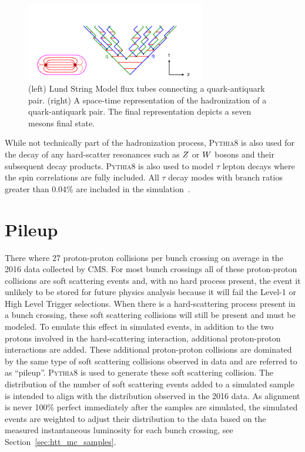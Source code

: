 \begin{figure}[htbp]
\centering
     \includegraphics[width=0.7\textwidth]{simulation/plots/lund_time-space.png}
     \caption{
(left) Lund String Model flux tubes connecting a quark-antiquark pair. (right) A
space-time representation of the hadronization of a quark-antiquark pair. 
The final representation depicts a seven mesons final state.
     }
     \label{fig:sim_lund_string}
\end{figure}

While not technically part of the hadronization process, \textsc{Pythia8} is also used for the 
decay of any hard-scatter resonances such as $Z$ or $W$ bosons and their subsequent
decay products. \textsc{Pythia8} is also used to model $\tau$ lepton decays where the spin
correlations are fully included. All $\tau$ decay modes with branch ratios greater than 0.04\%
are included in the simulation~\cite{ILTEN201477}.



\section{Pileup}
There where 27 proton-proton collisions per bunch crossing on average
in the 2016 data collected by CMS.
For most bunch crossings all of these proton-proton collisions are soft
scattering events and, with no hard process present, the event it unlikely to be stored for
future physics analysis because it will fail the Level-1 or High Level Trigger selections. 
When there is a hard-scattering process present in a bunch crossing,
these soft scattering collisions will still be present and must be modeled. 
To emulate this effect in simulated events, in addition to the two protons involved in the 
hard-scattering interaction, additional proton-proton interactions are added. 
These additional proton-proton collisions are
dominated by the same type of soft scattering collisions observed in data and are referred to as ``pileup''.
\textsc{Pythia8} is used to generate these soft scattering collision. 
The distribution of the number of soft scattering events added to a simulated 
sample is intended to align with the distribution observed in the 2016 data.
As alignment is never 100\% perfect immediately after the samples are simulated, the simulated events
are weighted to adjust their distribution to the data based on the measured instantaneous
luminosity for each bunch crossing, see Section~\ref{sec:htt_mc_samples}.



